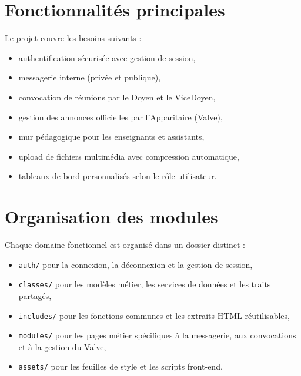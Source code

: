 \documentclass[12pt,a4paper]{article}
\begin{document}
\section{Fonctionnalités principales}
Le projet couvre les besoins suivants :
\begin{itemize}
  \item authentification sécurisée avec gestion de session,
  \item messagerie interne (privée et publique),
  \item convocation de réunions par le Doyen et le ViceDoyen,
  \item gestion des annonces officielles par l'Apparitaire (Valve),
  \item mur pédagogique pour les enseignants et assistants,
  \item upload de fichiers multimédia avec compression automatique,
  \item tableaux de bord personnalisés selon le rôle utilisateur.
\end{itemize}

\section{Organisation des modules}
Chaque domaine fonctionnel est organisé dans un dossier distinct :
\begin{itemize}
  \item \texttt{auth/} pour la connexion, la déconnexion et la gestion de session,
  \item \texttt{classes/} pour les modèles métier, les services de données et les traits partagés,
  \item \texttt{includes/} pour les fonctions communes et les extraits HTML réutilisables,
  \item \texttt{modules/} pour les pages métier spécifiques à la messagerie, aux convocations et à la gestion du Valve,
  \item \texttt{assets/} pour les feuilles de style et les scripts front-end.
\end{itemize}
\end{document}
